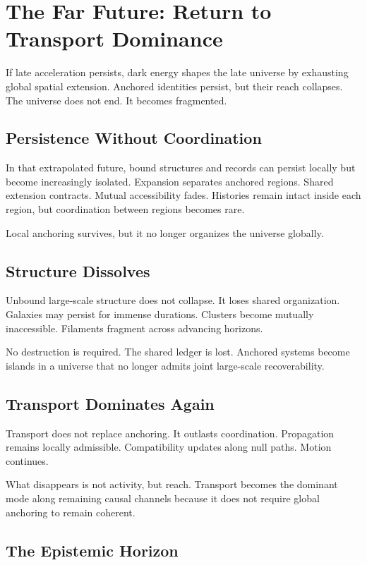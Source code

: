 \documentclass[11pt,twoside,openright]{book}
\begin{document}
\chapter{The Far Future: Return to Transport Dominance}

If late acceleration persists, dark energy shapes the late universe by exhausting global spatial extension. Anchored identities persist, but their reach collapses. The universe does not end. It becomes fragmented.

\section*{Persistence Without Coordination}

In that extrapolated future, bound structures and records can persist locally but become increasingly isolated. Expansion separates anchored regions. Shared extension contracts. Mutual accessibility fades. Histories remain intact inside each region, but coordination between regions becomes rare.

Local anchoring survives, but it no longer organizes the universe globally.

\section*{Structure Dissolves}

Unbound large-scale structure does not collapse. It loses shared organization. Galaxies may persist for immense durations. Clusters become mutually inaccessible. Filaments fragment across advancing horizons.

No destruction is required. The shared ledger is lost. Anchored systems become islands in a universe that no longer admits joint large-scale recoverability.

\section*{Transport Dominates Again}

Transport does not replace anchoring. It outlasts coordination. Propagation remains locally admissible. Compatibility updates along null paths. Motion continues.

What disappears is not activity, but reach. Transport becomes the dominant mode along remaining causal channels because it does not require global anchoring to remain coherent.

\section*{The Epistemic Horizon}
\end{document}
